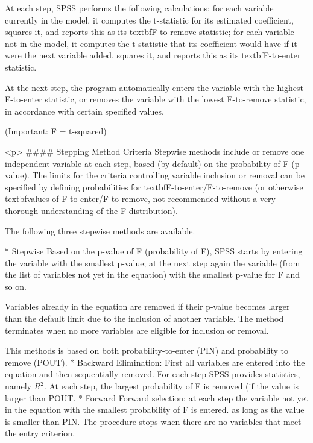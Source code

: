 At each step, SPSS performs the following calculations: for each variable currently in the model, it computes the t-statistic for its estimated coefficient, squares it, and reports this as its textbf{F-to-remove} statistic; for each variable not in the model, it computes the t-statistic that its coefficient would have if it were the next variable added, squares it, and reports this as its textbf{F-to-enter} statistic.

At the next step, the program automatically enters the variable with the highest F-to-enter statistic, or removes the variable with the lowest F-to-remove statistic, in accordance with certain specified values. 

(Important: F = t-squared)

<p>
#### {Stepping Method Criteria}
Stepwise methods include or remove one independent variable at each step, based (by default) on the probability of F (p-value). The limits for the criteria controlling variable inclusion or removal can be specified by defining probabilities for textbf{F-to-enter/F-to-remove} (or otherwise textbf{values of F-to-enter/F-to-remove}, not recommended without a very thorough understanding of the F-distribution).




The following three stepwise methods are available.


         * Stepwise Based on the p-value of F (probability of F), SPSS starts by entering the variable with the smallest p-value; at the next step again the variable (from the list of variables not yet in the equation) with the smallest p-value for F and so on. 
    
    Variables already in the equation are removed if their p-value becomes larger than the default limit due to the inclusion of another variable. The method terminates when no more variables are eligible for inclusion or removal.	
    
    This methods is based on both probability-to-enter (PIN) and probability to remove (POUT).
         * Backward Elimination: First all variables are entered into the equation and then sequentially removed. For each step SPSS provides statistics, namely $R^2$. At each step, the largest probability of F is removed (if the value is larger than POUT.
         * Forward Forward selection: at each step the variable not yet in the equation with the smallest probability of F is entered. as long as the value is smaller than PIN. The procedure stops when there are no variables that meet the entry criterion.

